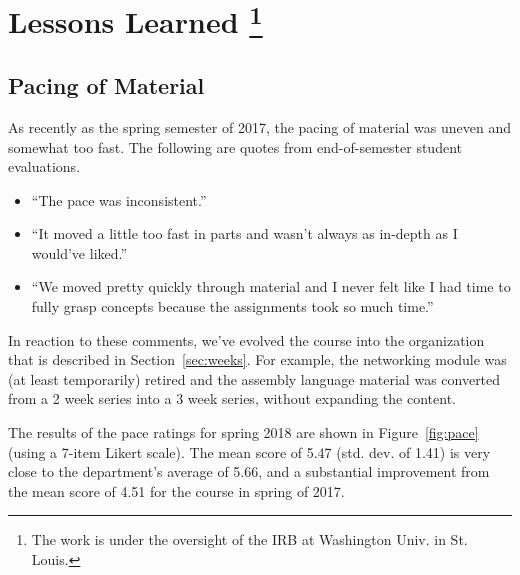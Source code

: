 \section{Lessons Learned%
\protect\footnote{The work is under the oversight of the IRB at Washington Univ. in St. Louis.}
}
\label{sec:lessons}


\subsection{Pacing of Material}


As recently as the spring semester of 2017, the pacing of material
was uneven and somewhat too fast.  The following are quotes from
end-of-semester student evaluations.
\begin{itemize}
\item ``The pace was inconsistent.''
\item ``It moved a little too fast in parts and wasn't always as
in-depth as I would've liked.''
\item ``We moved pretty quickly through material and I never felt like I had
time to fully grasp concepts because the assignments took so much time.''
\end{itemize}
In reaction to these comments, we've evolved the course into the organization
that is described in Section~\ref{sec:weeks}.
For example, the networking module was (at least temporarily) retired
and the assembly language material was converted from a
2 week series into a 3 week series, without expanding the content.

The results of the pace ratings for spring 2018 are shown in
Figure~\ref{fig:pace} (using a 7-item Likert scale).
The mean score of 5.47 (std. dev. of 1.41)
is very close to the department's average of
5.66, and a substantial improvement from the mean score of 4.51
for the course in spring of 2017.

